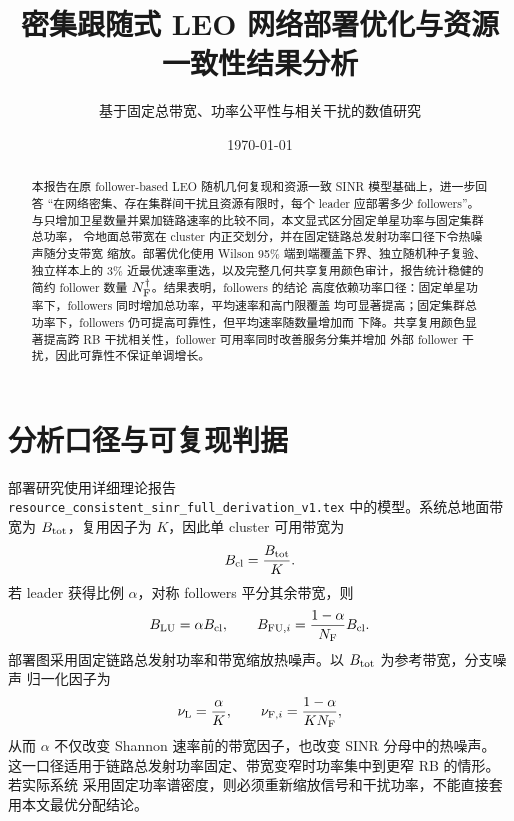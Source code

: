 \documentclass[UTF8,a4paper,11pt]{ctexart}
\title{密集跟随式 LEO 网络部署优化与资源一致性结果分析}
\author{基于固定总带宽、功率公平性与相关干扰的数值研究}
\date{\today}
\newcommand{\NF}{N_{\mathrm F}}
\begin{document}
\maketitle

\begin{abstract}
本报告在原 follower-based LEO 随机几何复现和资源一致 SINR 模型基础上，进一步回答
``在网络密集、存在集群间干扰且资源有限时，每个 leader 应部署多少 followers''。
与只增加卫星数量并累加链路速率的比较不同，本文显式区分固定单星功率与固定集群总功率，
令地面总带宽在 cluster 内正交划分，并在固定链路总发射功率口径下令热噪声随分支带宽
缩放。部署优化使用 Wilson 95\% 端到端覆盖下界、独立随机种子复验、独立样本上的
3\% 近最优速率重选，以及完整几何共享复用颜色审计，报告统计稳健的简约 follower 数量
$N_{\rm F}^{\dagger}$。结果表明，followers 的结论
高度依赖功率口径：固定单星功率下，followers 同时增加总功率，平均速率和高门限覆盖
均可显著提高；固定集群总功率下，followers 仍可提高可靠性，但平均速率随数量增加而
下降。共享复用颜色显著提高跨 RB 干扰相关性，follower 可用率同时改善服务分集并增加
外部 follower 干扰，因此可靠性不保证单调增长。
\end{abstract}

\section{分析口径与可复现判据}

部署研究使用详细理论报告
\texttt{resource\_consistent\_sinr\_full\_derivation\_v1.tex} 中的模型。系统总地面带宽为
$B_{\rm tot}$，复用因子为 $K$，因此单 cluster 可用带宽为
\begin{equation}
 B_{\rm cl}=\frac{B_{\rm tot}}{K}.
\end{equation}
若 leader 获得比例 $\alpha$，对称 followers 平分其余带宽，则
\begin{equation}
 B_{\rm LU}=\alpha B_{\rm cl},\qquad
 B_{{\rm FU},i}=\frac{1-\alpha}{\NF}B_{\rm cl}.
\end{equation}
部署图采用固定链路总发射功率和带宽缩放热噪声。以 $B_{\rm tot}$ 为参考带宽，分支噪声
归一化因子为
\begin{equation}
 \nu_{\rm L}=\frac{\alpha}{K},\qquad
 \nu_{{\rm F},i}=\frac{1-\alpha}{K\NF},
\end{equation}
从而 $\alpha$ 不仅改变 Shannon 速率前的带宽因子，也改变 SINR 分母中的热噪声。
这一口径适用于链路总发射功率固定、带宽变窄时功率集中到更窄 RB 的情形。若实际系统
采用固定功率谱密度，则必须重新缩放信号和干扰功率，不能直接套用本文最优分配结论。
\end{document}
